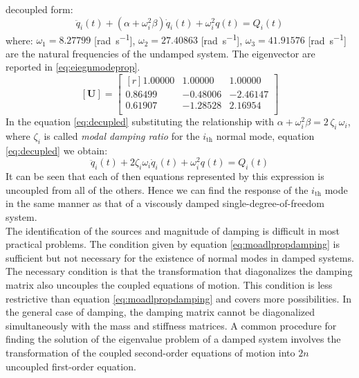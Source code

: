decoupled form:
\begin{equation}\label{eq:decupled}
  \ddot{q}_{i}(t) + (\alpha + \omega_{i}^2\beta)\dot{q}_{i}(t) +
  \omega_{i}^{2}q(t) = Q_{i}(t)
\end{equation}
where: \(\omega_{1} = 8.27799\) [\si{\radian\per\second}],
\(\omega_{2} = 27.40863\) [\si{\radian\per\second}],
\(\omega_{3} = 41.91576\) [\si{\radian\per\second}] are
the natural frequencies of the undamped system.
The eigenvector are reported in \eqref{eq:eiegnmodeprop}.
\begin{equation}\label{eq:eiegnmodeprop}
	[\mathbf{U}] = \begin{bmatrix*}[r]
		1.00000 & 1.00000 & 1.00000 \\
		0.86499 &-0.48006 &-2.46147 \\
		0.61907 &-1.28528 & 2.16954 \\
 	\end{bmatrix*}
\end{equation}
In the equation \eqref{eq:decupled} substituting the relationship with 
\(\alpha + \omega^{2}_{i}\beta = 2\,\zeta_{i}\,\omega_{i}\), where
\(\zeta_{i}\) is called \emph{modal damping ratio} for the \(i_\text{th}\) normal
mode, equation \eqref{eq:decupled} we obtain:
\begin{equation}\label{eq:decupled2}
  \ddot{q}_{i}(t) + 2\zeta_{i}\omega_{i}\dot{q}_{i}(t) +
  \omega_{i}^{2}q(t) = Q_{i}(t)
\end{equation}
It can be seen that each of then equations represented by this expression is
uncoupled from all of the others.
Hence we can find the response of the \(i_\text{th}\) mode in the same manner
as that of a viscously damped single-degree-of-freedom system.\\
%
%
%
%
%
The identification of the sources and magnitude of damping is difficult in most
practical problems.
The condition given by equation \eqref{eq:moadlpropdamping} is sufficient but not
necessary for the existence of normal modes in damped systems.
The necessary condition is that the transformation that diagonalizes the damping
matrix also uncouples the coupled equations of motion.
This condition is less restrictive than equation \eqref{eq:moadlpropdamping}
and covers more possibilities.
In the general case of damping, the damping matrix cannot be diagonalized
simultaneously with the mass and stiffness matrices.
A common procedure for finding the solution of the eigenvalue problem of a
damped system involves the transformation of the coupled second-order
equations of motion into \(2n\) uncoupled first-order equation.
%


